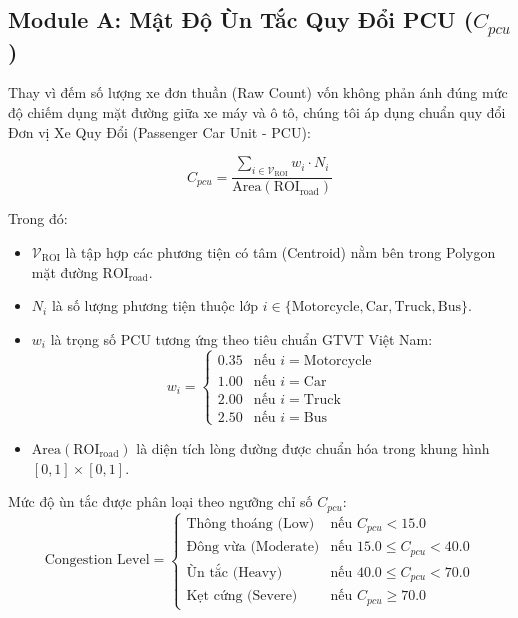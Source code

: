 \documentclass[conference]{IEEEtran}
\begin{document}
\subsection{Module A: Mật Độ Ùn Tắc Quy Đổi PCU ($C_{pcu}$)}
Thay vì đếm số lượng xe đơn thuần (Raw Count) vốn không phản ánh đúng mức độ chiếm dụng mặt đường giữa xe máy và ô tô, chúng tôi áp dụng chuẩn quy đổi Đơn vị Xe Quy Đổi (Passenger Car Unit - PCU):

\begin{equation}
C_{pcu} = \frac{\sum_{i \in \mathcal{V}_{\text{ROI}}} w_i \cdot N_i}{\text{Area}(\text{ROI}_{\text{road}})}
\end{equation}

Trong đó:
\begin{itemize}
    \item $\mathcal{V}_{\text{ROI}}$ là tập hợp các phương tiện có tâm (Centroid) nằm bên trong Polygon mặt đường $\text{ROI}_{\text{road}}$.
    \item $N_i$ là số lượng phương tiện thuộc lớp $i \in \{\text{Motorcycle}, \text{Car}, \text{Truck}, \text{Bus}\}$.
    \item $w_i$ là trọng số PCU tương ứng theo tiêu chuẩn GTVT Việt Nam:
    \begin{equation}
    w_i = \begin{cases} 
    0.35 & \text{nếu } i = \text{Motorcycle} \\
    1.00 & \text{nếu } i = \text{Car} \\
    2.00 & \text{nếu } i = \text{Truck} \\
    2.50 & \text{nếu } i = \text{Bus}
    \end{cases}
    \end{equation}
    \item $\text{Area}(\text{ROI}_{\text{road}})$ là diện tích lòng đường được chuẩn hóa trong khung hình $[0, 1] \times [0, 1]$.
\end{itemize}

Mức độ ùn tắc được phân loại theo ngưỡng chỉ số $C_{pcu}$:
\begin{equation}
\text{Congestion Level} = \begin{cases}
\text{Thông thoáng (Low)} & \text{nếu } C_{pcu} < 15.0 \\
\text{Đông vừa (Moderate)} & \text{nếu } 15.0 \le C_{pcu} < 40.0 \\
\text{Ùn tắc (Heavy)} & \text{nếu } 40.0 \le C_{pcu} < 70.0 \\
\text{Kẹt cứng (Severe)} & \text{nếu } C_{pcu} \ge 70.0
\end{cases}
\end{equation}
\end{document}
